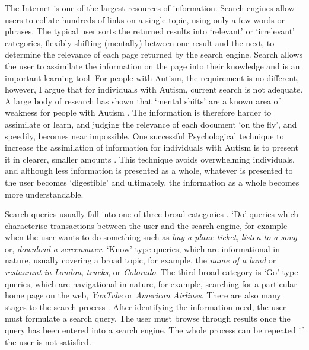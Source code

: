 \documentclass[a4paper, 11pt]{article}
\begin{document}
The Internet is one of the largest resources of information. Search engines allow users to collate hundreds of links on a single topic, using only a few words or phrases. The typical user sorts the returned results into `relevant' or `irrelevant' categories, flexibly shifting (mentally) between one result and the next, to determine the relevance of each page returned by the search engine. Search allows the user to assimilate the information on the page into their knowledge and is an important learning tool. For people with Autism, the requirement is no different, however, I argue that for individuals with Autism, current search is not adequate. A large body of research has shown that `mental shifts' are a known area of weakness for people with Autism \cite{disengagement}. The information is therefore harder to assimilate or learn, and judging the relevance of each document `on the fly', and speedily, becomes near impossible. One successful Psychological technique to increase the assimilation of information for individuals with Autism is to present it in clearer, smaller amounts \cite{AdultsWithAutism}. This technique avoids overwhelming individuals, and although less information is presented as a whole, whatever is presented to the user becomes `digestible' and ultimately, the information as a whole becomes more understandable.  \\

\vspace{5mm}

Search queries usually fall into one of three broad categories \cite{seo}.  `Do' queries which characterise transactions between the user and the search engine, for example when the user wants to do something such as \textit{buy a plane ticket}, \textit{listen to a song} or, \textit{download a screensaver}. `Know' type queries, which are informational in nature, usually covering a broad topic, for example, the \textit{name of a band} or \textit{restaurant in London}, \textit{trucks}, or \textit{Colorado}. The third broad category is `Go' type queries, which are navigational in nature, for example, searching for a particular home page on the web, \textit{YouTube} or \textit{American Airlines}. There are also many stages to the search process \cite{seo}. After identifying the information need, the user must formulate a search query. The user must browse through results once the query has been entered into a search engine. The whole process can be repeated if the user is not satisfied. 
\end{document}
